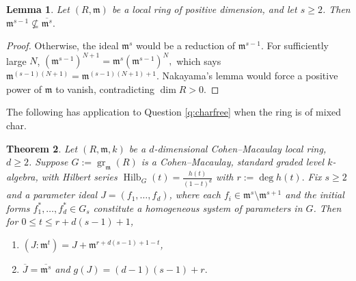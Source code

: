 \documentclass[11pt,a4paper]{amsart}
\numberwithin{equation}{section}
\newtheorem{theorem}{Theorem}[section]
\newtheorem{lemma}[theorem]{Lemma}
\newcommand{\m}{\mathfrak m}
\newcommand{\ol}[1]{\overline{#1}}
\newcommand{\gr}{\operatorname{gr}}
\begin{document}
 \begin{lemma}
 	\label{lem:powernotintegral}
 	Let $(R,\m)$ be a   local ring of positive dimension,
 	and let $s\geq2$.  Then
 	$ \m^{s-1}\not\subseteq\ol{\m^s}. $
 \end{lemma}
 \begin{proof}
 	Otherwise, the ideal $\m^s$ would be a reduction of
 	$\m^{s-1}$.  For sufficiently large $N$,
 	$ (\m^{s-1})^{N+1}=\m^s(\m^{s-1})^N, $
 	which says $\m^{(s-1)(N+1)}=\m^{(s-1)(N+1)+1}$.
 	Nakayama's lemma would force a positive power of $\m$
 	to vanish, contradicting $\dim R>0$.
 \end{proof}
 The following has application to {Question} \ref{q:charfree} when the ring is of mixed char.
 \begin{theorem}
 	\label{thm:level}
 	Let $(R,\m,k)$ be a $d$-dimensional Cohen--Macaulay local
 	ring, $d\geq2$.  Suppose  
 	$G:=\gr_\m(R)$ is a Cohen--Macaulay, standard graded
 	\emph{level} $k$-algebra, with Hilbert series
 	$	\operatorname{Hilb}_G(t)=\frac{h(t)}{(1-t)^d}$ with $ r:=\deg h(t).$
 	Fix $s\geq2$ and a parameter ideal
 	$J=(f_1,\ldots,f_d)$, where each
 	$f_i\in\m^s\setminus\m^{s+1}$ and the initial forms
 	$f_1^*,\ldots,f_d^*\in G_s$ constitute a homogeneous
 	system of parameters in $G$.  Then for
 	$0\leq t\leq r+d(s-1)+1$,
 	
 	\begin{enumerate}[label=\textup{(\roman*)}]
 		\item  
 		$(	J:\m^t)=J+\m^{r+d(s-1)+1-t}$,
 		\item
 		$	\ol J=\ol{\m^s}$ and
 		$g(J)=(d-1)(s-1)+r.$ 
 	\end{enumerate}	
 \end{theorem}
\end{document}
